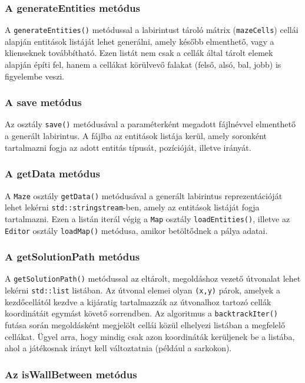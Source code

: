 \subsubsection{A generateEntities metódus}

A \verb|generateEntities()| metódussal a labirintust tároló mátrix (\verb|mazeCells|) cellái alapján entitások listáját lehet generálni, amely később elmenthető, vagy a klienseknek továbbítható. Ezen listát nem csak a cellák által tárolt elemek alapján építi fel, hanem a cellákat körülvevő falakat (felső, alsó, bal, jobb) is figyelembe veszi.

\subsubsection{A save metódus}

Az osztály \verb|save()| metódusával a paraméterként megadott fájlnévvel elmenthető a generált labirintus. A fájlba az entitások listája kerül, amely soronként tartalmazni fogja az adott entitás típusát, pozícióját, illetve irányát.

\subsubsection{A getData metódus}

A \verb|Maze| osztály \verb|getData()| metódusával a generált labirintus reprezentációját lehet lekérni \verb|std::stringstream|-ben, amely az entitások listáját fogja tartalmazni. Ezen a listán iterál végig a \verb|Map| osztály \verb|loadEntities()|, illetve az \verb|Editor| osztály \verb|loadMap()| metódusa, amikor betöltődnek a pálya adatai.

\subsubsection{A getSolutionPath metódus}

A \verb|getSolutionPath()| metódussal az eltárolt, megoldáshoz vezető útvonalat lehet lekérni \verb|std::list| listában. Az útvonal elemei olyan \verb|(x,y)| párok, amelyek a kezdőcellától kezdve a kijáratig tartalmazzák az útvonalhoz tartozó cellák koordinátáit egymást követő sorrendben. Az algoritmus a \verb|backtrackIter()| futása során megoldásként megjelölt cellái közül elhelyezi listában a megfelelő cellákat. Ügyel arra, hogy mindig csak azon koordináták kerüljenek be a listába, ahol a játékosnak irányt kell változtatnia (például a sarkokon).

\subsubsection{Az isWallBetween metódus}

